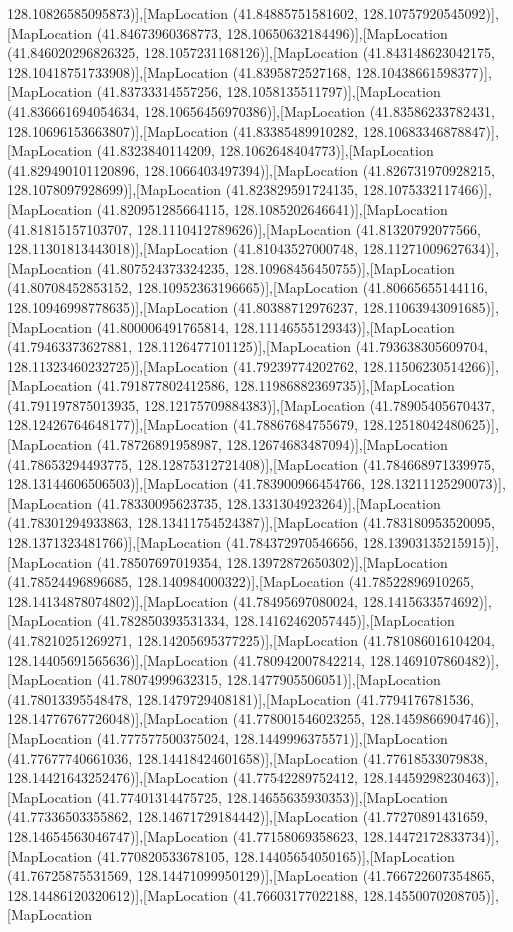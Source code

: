 128.10826585095873)],[MapLocation (41.84885751581602, 128.10757920545092)],[MapLocation (41.84673960368773, 128.10650632184496)],[MapLocation (41.846020296826325, 128.1057231168126)],[MapLocation (41.843148623042175, 128.10418751733908)],[MapLocation (41.8395872527168, 128.10438661598377)],[MapLocation (41.83733314557256, 128.1058135511797)],[MapLocation (41.836661694054634, 128.10656456970386)],[MapLocation (41.83586233782431, 128.10696153663807)],[MapLocation (41.83385489910282, 128.10683346878847)],[MapLocation (41.8323840114209, 128.1062648404773)],[MapLocation (41.829490101120896, 128.1066403497394)],[MapLocation (41.826731970928215, 128.1078097928699)],[MapLocation (41.823829591724135, 128.1075332117466)],[MapLocation (41.820951285664115, 128.1085202646641)],[MapLocation (41.81815157103707, 128.1110412789626)],[MapLocation (41.81320792077566, 128.11301813443018)],[MapLocation (41.81043527000748, 128.11271009627634)],[MapLocation (41.807524373324235, 128.10968456450755)],[MapLocation (41.80708452853152, 128.10952363196665)],[MapLocation (41.80665655144116, 128.10946998778635)],[MapLocation (41.80388712976237, 128.11063943091685)],[MapLocation (41.800006491765814, 128.11146555129343)],[MapLocation (41.79463373627881, 128.1126477101125)],[MapLocation (41.793638305609704, 128.11323460232725)],[MapLocation (41.79239774202762, 128.11506230514266)],[MapLocation (41.791877802412586, 128.11986882369735)],[MapLocation (41.791197875013935, 128.12175709884383)],[MapLocation (41.78905405670437, 128.12426764648177)],[MapLocation (41.78867684755679, 128.12518042480625)],[MapLocation (41.78726891958987, 128.12674683487094)],[MapLocation (41.78653294493775, 128.12875312721408)],[MapLocation (41.784668971339975, 128.13144606506503)],[MapLocation (41.783900966454766, 128.13211125290073)],[MapLocation (41.78330095623735, 128.1331304923264)],[MapLocation (41.78301294933863, 128.13411754524387)],[MapLocation (41.783180953520095, 128.1371323481766)],[MapLocation (41.784372970546656, 128.13903135215915)],[MapLocation (41.78507697019354, 128.13972872650302)],[MapLocation (41.78524496896685, 128.140984000322)],[MapLocation (41.78522896910265, 128.14134878074802)],[MapLocation (41.78495697080024, 128.1415633574692)],[MapLocation (41.782850393531334, 128.14162462057445)],[MapLocation (41.78210251269271, 128.14205695377225)],[MapLocation (41.781086016104204, 128.14405691565636)],[MapLocation (41.780942007842214, 128.1469107860482)],[MapLocation (41.78074999632315, 128.1477905506051)],[MapLocation (41.78013395548478, 128.1479729408181)],[MapLocation (41.7794176781536, 128.14776767726048)],[MapLocation (41.778001546023255, 128.1459866904746)],[MapLocation (41.777577500375024, 128.1449996375571)],[MapLocation (41.77677740661036, 128.14418424601658)],[MapLocation (41.77618533079838, 128.14421643252476)],[MapLocation (41.77542289752412, 128.14459298230463)],[MapLocation (41.77401314475725, 128.14655635930353)],[MapLocation (41.77336503355862, 128.14671729184442)],[MapLocation (41.77270891431659, 128.14654563046747)],[MapLocation (41.77158069358623, 128.14472172833734)],[MapLocation (41.770820533678105, 128.14405654050165)],[MapLocation (41.76725875531569, 128.14471099950129)],[MapLocation (41.766722607354865, 128.14486120320612)],[MapLocation (41.76603177022188, 128.14550070208705)],[MapLocation 